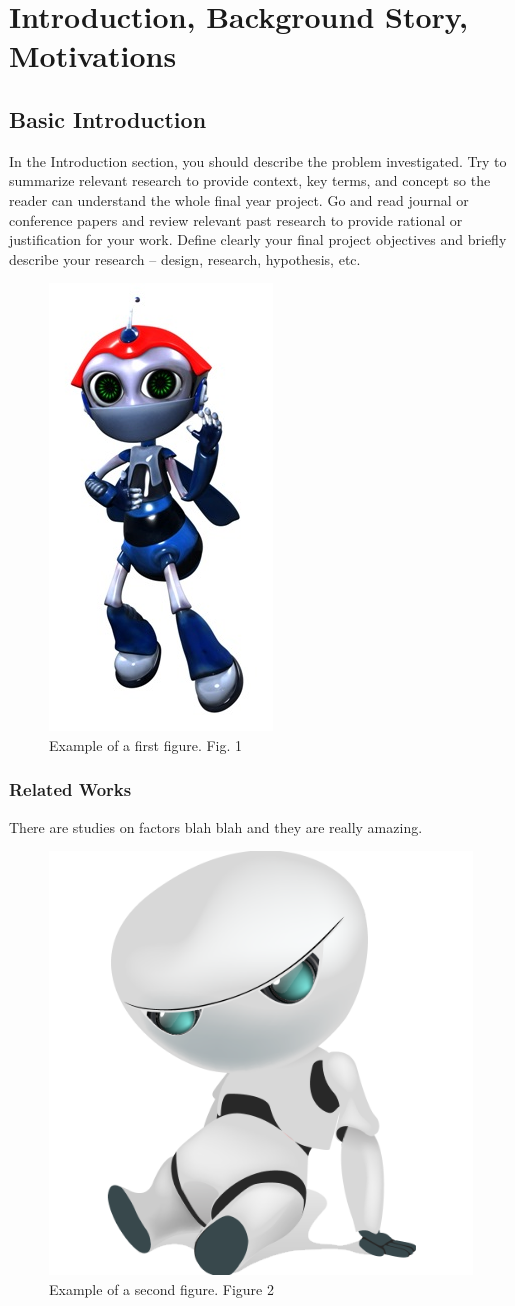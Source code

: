 \chapter{Introduction, Background Story, Motivations}
\section{Basic Introduction}
In the Introduction section, you should describe the problem investigated. Try to summarize relevant research to provide context, key terms, and concept so the reader can understand the whole final year project. Go and read journal or conference papers and review relevant past research to 
provide rational or justification for your work. Define clearly your final project objectives and briefly describe your research – design, 
research, hypothesis, etc. 

\begin{figure}[hbt!]\centering
\includegraphics[width=.3\textwidth]{bee}
\caption{Example of a first figure. Fig. 1}
\end{figure}

\subsection{Related Works}
There are studies on factors blah blah \cite{audibert:2004} and they are really amazing\cite{budanitsky:hirst:2006}.

\begin{figure}[hbt!]\centering
\includegraphics[width=.3\textwidth]{robot}
\caption{Example of a second figure. Figure 2}
\end{figure}

